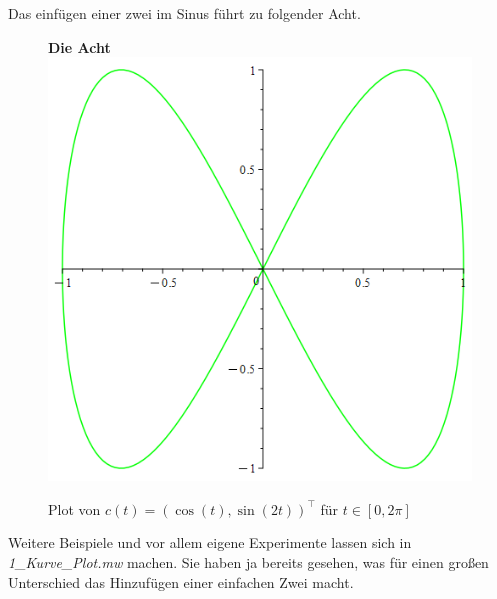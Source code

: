\documentclass[12pt]{article}
\newenvironment{Fig}{\begin{figure}[H]
\begin{center}}{\end{center}\end{figure}}
\begin{document}
Das einfügen einer zwei im Sinus führt zu folgender Acht.
\begin{Fig}
\textbf{Die Acht}\\
\includegraphics[scale=0.25]{Kurve_Plot cos(t), sin(2t).png}
\caption{Plot von $c(t) = \left(\cos(t), \sin(2t)\right)^\top$ für $t \in [0,2\pi]$}
\label{fig:Die Acht}
\end{Fig}

Weitere Beispiele und vor allem eigene Experimente lassen sich in \textit{1\_Kurve\_Plot.mw} machen. Sie haben ja bereits gesehen, was für einen großen Unterschied das Hinzufügen einer einfachen Zwei macht.
\end{document}
